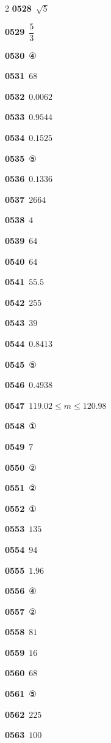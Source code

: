 \documentclass[10pt,a4paper]{article}
\begin{document}
\begin{multicols}{2}
\noindent\textbf{0528}\ $\sqrt{5}$\par
\noindent\textbf{0529}\ $\dfrac{5}{3}$\par
\noindent\textbf{0530}\ ④\par
\noindent\textbf{0531}\ $68$\par
\noindent\textbf{0532}\ $0.0062$\par
\noindent\textbf{0533}\ $0.9544$\par
\noindent\textbf{0534}\ $0.1525$\par
\noindent\textbf{0535}\ ⑤\par
\noindent\textbf{0536}\ $0.1336$\par
\noindent\textbf{0537}\ $2664$\par
\noindent\textbf{0538}\ $4$\par
\noindent\textbf{0539}\ $64$\par
\noindent\textbf{0540}\ $64$\par
\noindent\textbf{0541}\ $55.5$\par
\noindent\textbf{0542}\ $255$\par
\noindent\textbf{0543}\ $39$\par
\noindent\textbf{0544}\ $0.8413$\par
\noindent\textbf{0545}\ ⑤\par
\noindent\textbf{0546}\ $0.4938$\par
\noindent\textbf{0547}\ $119.02\le m\le 120.98$\par
\noindent\textbf{0548}\ ①\par
\noindent\textbf{0549}\ $7$\par
\noindent\textbf{0550}\ ②\par
\noindent\textbf{0551}\ ②\par
\noindent\textbf{0552}\ ①\par
\noindent\textbf{0553}\ $135$\par
\noindent\textbf{0554}\ $94$\par
\noindent\textbf{0555}\ $1.96$\par
\noindent\textbf{0556}\ ④\par
\noindent\textbf{0557}\ ②\par
\noindent\textbf{0558}\ $81$\par
\noindent\textbf{0559}\ $16$\par
\noindent\textbf{0560}\ $68$\par
\noindent\textbf{0561}\ ⑤\par
\noindent\textbf{0562}\ $225$\par
\noindent\textbf{0563}\ $100$\par

\end{multicols}
\end{document}

